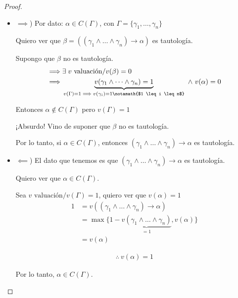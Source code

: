\begin{proof} \phantom{.}

    \begin{itemize}
        \item $\implies$) Por dato: $\alpha \in C(\Gamma)$, con 
            $\Gamma = \{ \gamma_1, \dotsc, \gamma_n \}$

            Quiero ver que 
            $\beta = ((\gamma_1 \wedge \dots \wedge \gamma_n) \to \alpha)$
            es tautología.

            \medskip

            Supongo que $\beta$ no es tautología.
            \begin{align*}
                \implies& \exists \; v \text{ valuación}/ v(\beta) = 0 \\
                \implies& \underbrace{
                    v(\gamma_1 \wedge \dots \wedge\gamma_n) = 1}_{
                    v(\Gamma)=1 \implies v(\gamma_i)=1
                \notamath{$1 \leq i \leq n$}}
                ~\wedge~ v(\alpha)=0
            \end{align*}

            Entonces $\alpha \notin C(\Gamma)$ pero $v(\Gamma)= 1$

            ¡Absurdo! Vino de suponer que $\beta$ no es tautología.

            Por lo tanto, si $\alpha \in C(\Gamma)$, entonces 
            $(\gamma_1 \wedge \dots \wedge \gamma_n) \to \alpha$
            es tautología.

        \item $\impliedby$) El dato que tenemos es que 
            $(\gamma_1 \wedge \dots \wedge \gamma_n) \to \alpha$ es
            tautología.

             Quiero ver que $\alpha \in C(\Gamma)$.

             \medskip

            Sea $v \text{ valuación}/v(\Gamma)=1$, quiero ver que 
            $v(\alpha)=1$
             \begin{align*}
                 1 &= v((\gamma_1 \wedge \dots \wedge \gamma_n) \to \alpha)\\
                   &= \max \{ 1-
                    \underbrace{v(\gamma_1 \wedge \dots \wedge \gamma_n)}_{=1},
                   v(\alpha) \} \\
                   &= v(\alpha)
             \end{align*}

             \begin{gather*}
                 \therefore ~ v(\alpha) = 1
             \end{gather*}

             Por lo tanto, $\alpha \in C(\Gamma)$.
    \end{itemize}
\end{proof}


